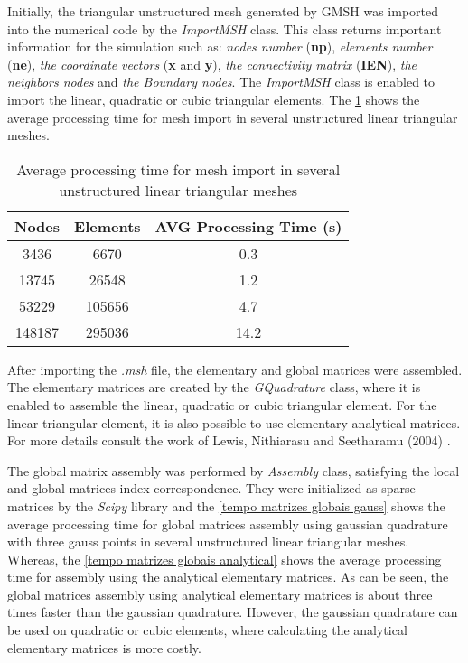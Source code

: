 \medskip
Initially, the triangular unstructured mesh generated by GMSH \cite{gmsh}
was imported into the numerical code by the \textit{ImportMSH} class.
This class returns important information for the simulation 
such as:
\textit{nodes number} (\textbf{np}), 
\textit{elements number} (\textbf{ne}), 
\textit{the coordinate vectors} (\textbf{x} and \textbf{y}), 
\textit{the connectivity matrix} (\textbf{IEN}),
\textit{the neighbors nodes} and 
\textit{the Boundary nodes}. 
The \textit{ImportMSH} class is 
enabled to import the linear, quadratic or cubic triangular elements.
The \ref{tempo malha} shows the average processing time for 
mesh import in several unstructured linear triangular meshes.

\vspace{0.5cm}
\begin{table}[H]
\centering
\begin{tabular}{ccc}
\toprule
\textbf{Nodes} & \textbf{Elements} & \textbf{AVG Processing Time} (s) \\
\midrule
3436 & 6670 & 0.3 \\
13745 & 26548 & 1.2 \\
53229 & 105656 & 4.7 \\
148187 & 295036 & 14.2 \\
\bottomrule
\end{tabular}
\caption{Average processing time for mesh import in several unstructured linear triangular meshes}
\label{tempo malha}
\end{table}

\medskip
After importing the \textit{.msh} file, the elementary and global matrices 
were assembled. 
The elementary matrices are created by the \textit{GQuadrature} class, 
where it is enabled to assemble the linear, quadratic or cubic triangular element.
For the linear 
triangular element, it is also possible to use elementary 
analytical matrices. For more details consult the work of Lewis, 
Nithiarasu and Seetharamu (2004) \cite{lewis2004}.

\medskip
The global matrix assembly was performed by \textit{Assembly} class, satisfying the local and global matrices index correspondence.
They were initialized as sparse matrices by 
the \textit{Scipy} library \cite{scipy} and 
the \ref{tempo matrizes globais gauss} shows the average processing time 
for global matrices assembly using gaussian quadrature 
with three gauss points in several unstructured linear 
triangular meshes. Whereas, the \ref{tempo matrizes globais analytical}
shows the average processing time for assembly using the analytical
elementary matrices. As can be seen,
the global matrices assembly using analytical elementary matrices is
about three times faster than the gaussian quadrature. However, the gaussian quadrature
can be used on quadratic or cubic elements, where calculating
the analytical elementary matrices is more costly.

